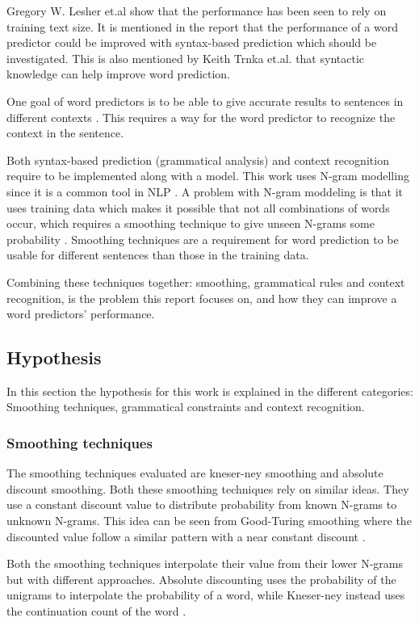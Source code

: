 Gregory W. Lesher et.al \cite{Lesher99effectsof} show that the performance has been seen to rely on training text size. It is mentioned in the report that the performance of a word predictor could be improved with syntax-based prediction which should be investigated. This is also mentioned by Keith Trnka et.al.\cite{keystrokes} that syntactic knowledge can help improve word prediction.
 
One goal of word predictors is to be able to give accurate results to sentences in different contexts \cite{DBLP:journals/corr/cs-CL-0009027}. This requires a way for the word predictor to recognize the context in the sentence.
 
Both syntax-based prediction (grammatical analysis) and context recognition require to be implemented along with a model. This work uses N-gram modelling since it is a common tool in NLP \cite{Wandmacher}. A problem with N-gram moddeling is that it uses training data which makes it possible that not all combinations of words occur, which requires a smoothing technique to give unseen N-grams some probability \cite{Russel}. Smoothing techniques are a requirement for word prediction to be usable for different sentences than those in the training data.
 
Combining  these techniques together: smoothing, grammatical rules and context recognition, is the problem this report focuses on, and how they can improve a word predictors' performance.

\subsection{Hypothesis}
In this section the hypothesis for this work is explained in the different categories: Smoothing techniques, grammatical constraints and context recognition.
\subsubsection{Smoothing techniques}
The smoothing techniques evaluated are kneser-ney smoothing and absolute discount smoothing. Both these smoothing techniques rely on similar ideas. They use a constant discount value to distribute probability from known N-grams to unknown N-grams. This idea can be seen from Good-Turing smoothing where the discounted value follow a similar pattern with a near constant discount \cite{coursera}.

Both the smoothing techniques interpolate their value from their lower N-grams but with different approaches. Absolute discounting uses the probability of the unigrams to interpolate the probability of a word, while Kneser-ney instead uses the continuation count of the word \cite{coursera}.

